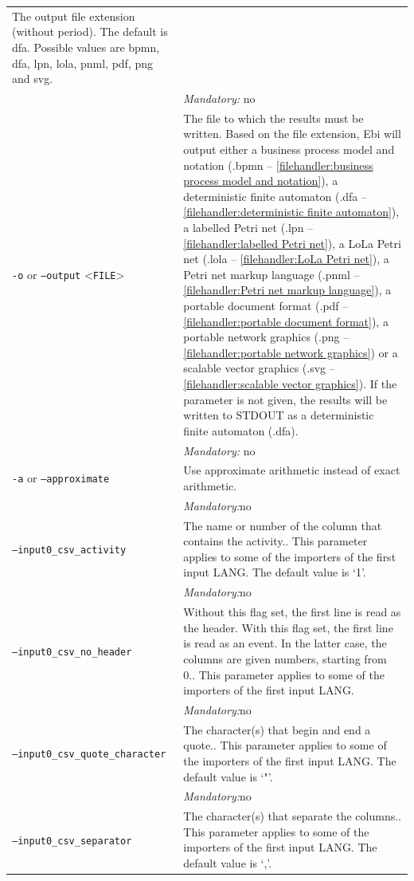 {\begin{tabularx}{\linewidth}{lX}
The output file extension (without period). The default is dfa. Possible values are bpmn, dfa, lpn, lola, pnml, pdf, png and svg.\\
&\textit{Mandatory:} \quad no\\
\texttt{-o} or \texttt{--output} <\texttt{FILE}> &
The file to which the results must be written. Based on the file extension, Ebi will output either a business process model and notation (.bpmn -- \cref{filehandler:business process model and notation}), a deterministic finite automaton (.dfa -- \cref{filehandler:deterministic finite automaton}), a labelled Petri net (.lpn -- \cref{filehandler:labelled Petri net}), a LoLa Petri net (.lola -- \cref{filehandler:LoLa Petri net}), a Petri net markup language (.pnml -- \cref{filehandler:Petri net markup language}), a portable document format (.pdf -- \cref{filehandler:portable document format}), a portable network graphics (.png -- \cref{filehandler:portable network graphics}) or a scalable vector graphics (.svg -- \cref{filehandler:scalable vector graphics}).
If the parameter is not given, the results will be written to STDOUT as a deterministic finite automaton (.dfa).\\
&\textit{Mandatory:} \quad no\\
\texttt{-a} or \texttt{--approximate} & Use approximate arithmetic instead of exact arithmetic.\\
&\textit{Mandatory:}\quad no\\
\texttt{--input0\_csv\_activity} & The name or number of the column that contains the activity.. This parameter applies to some of the importers of the first input LANG. The default value is `1'.\\
&\textit{Mandatory:}\quad no\\
\texttt{--input0\_csv\_no\_header} & Without this flag set, the first line is read as the header. 
    With this flag set, the first line is read as an event. In the latter case, the columns are given numbers, starting from 0.. This parameter applies to some of the importers of the first input LANG. \\
&\textit{Mandatory:}\quad no\\
\texttt{--input0\_csv\_quote\_character} & The character(s) that begin and end a quote.. This parameter applies to some of the importers of the first input LANG. The default value is `"'.\\
&\textit{Mandatory:}\quad no\\
\texttt{--input0\_csv\_separator} & The character(s) that separate the columns.. This parameter applies to some of the importers of the first input LANG. The default value is `,'.\\

\end{tabularx}}
